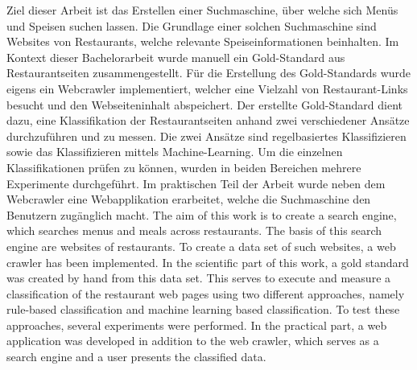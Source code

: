 
Ziel dieser Arbeit ist das Erstellen einer Suchmaschine, über welche sich Menüs und Speisen suchen lassen.
Die Grundlage einer solchen Suchmaschine sind Websites von Restaurants, welche relevante Speiseinformationen beinhalten.
Im Kontext dieser Bachelorarbeit wurde manuell ein Gold-Standard aus Restaurantseiten zusammengestellt.
Für die Erstellung des Gold-Standards wurde eigens ein Webcrawler implementiert, welcher eine Vielzahl von Restaurant-Links besucht und den Webseiteninhalt abspeichert.
Der erstellte Gold-Standard dient dazu, eine Klassifikation der Restaurantseiten anhand zwei verschiedener Ansätze durchzuführen und zu messen.
Die zwei Ansätze sind regelbasiertes Klassifizieren sowie das Klassifizieren mittels Machine-Learning.
Um die einzelnen Klassifikationen prüfen zu können, wurden in beiden Bereichen mehrere Experimente durchgeführt.
Im praktischen Teil der Arbeit wurde neben dem Webcrawler eine Webapplikation erarbeitet, welche die Suchmaschine den Benutzern zugänglich macht.
The aim of this work is to create a search engine, which searches menus and meals across restaurants.
The basis of this search engine are websites of restaurants.
To create a data set of such websites, a web crawler has been implemented.
In the scientific part of this work, a gold standard was created by hand from this data set.
This serves to execute and measure a classification of the restaurant web pages using two different approaches, namely rule-based classification and machine learning based classification.
To test these approaches, several experiments were performed.
In the practical part, a web application was developed in addition to the web crawler, which serves as a search engine and a user presents the classified data.
